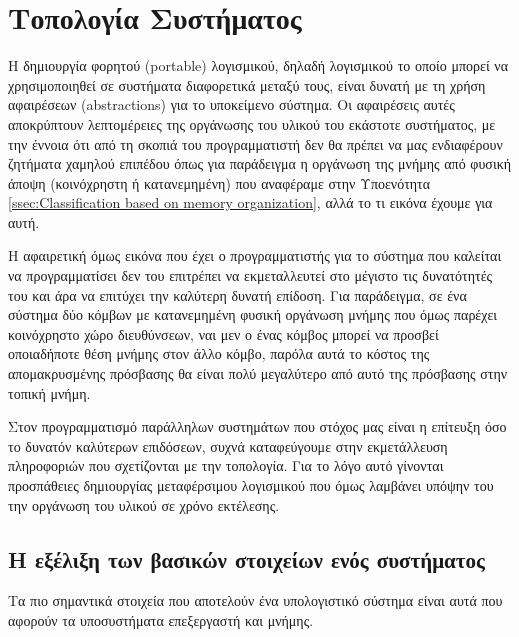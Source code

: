 \chapter{Τοπολογία Συστήματος}
\label{ch:System Topology}
Η δημιουργία φορητού (portable) λογισμικού, δηλαδή λογισμικού το οποίο μπορεί να χρησιμοποιηθεί σε συστήματα διαφορετικά μεταξύ τους, είναι δυνατή με τη χρήση αφαιρέσεων (abstractions) για το υποκείμενο σύστημα. Οι αφαιρέσεις αυτές αποκρύπτουν λεπτομέρειες της οργάνωσης του υλικού του εκάστοτε συστήματος, με την έννοια ότι από τη σκοπιά του προγραμματιστή δεν θα πρέπει να μας ενδιαφέρουν ζητήματα χαμηλού επιπέδου όπως για παράδειγμα η οργάνωση της μνήμης από φυσική άποψη (κοινόχρηστη ή κατανεμημένη) που αναφέραμε στην Υποενότητα \ref{ssec:Classification based on memory organization}, αλλά το τι εικόνα έχουμε για αυτή.

Η αφαιρετική όμως εικόνα που έχει ο προγραμματιστής για το σύστημα που καλείται να προγραμματίσει δεν του επιτρέπει να εκμεταλλευτεί στο μέγιστο τις δυνατότητές του και άρα να επιτύχει την καλύτερη δυνατή επίδοση. Για παράδειγμα, σε ένα σύστημα δύο κόμβων με κατανεμημένη φυσική οργάνωση μνήμης που όμως παρέχει κοινόχρηστο χώρο διευθύνσεων, ναι μεν ο ένας κόμβος μπορεί να προσβεί οποιαδήποτε θέση μνήμης στον άλλο κόμβο, παρόλα αυτά το κόστος της απομακρυσμένης πρόσβασης θα είναι πολύ μεγαλύτερο από αυτό της πρόσβασης στην τοπική μνήμη.

Στον προγραμματισμό παράλληλων συστημάτων που στόχος μας είναι η επίτευξη όσο το δυνατόν καλύτερων επιδόσεων, συχνά καταφεύγουμε στην εκμετάλλευση πληροφοριών που σχετίζονται με την τοπολογία. Για το λόγο αυτό γίνονται προσπάθειες δημιουργίας μεταφέρσιμου λογισμικού που όμως λαμβάνει υπόψην του την οργάνωση του υλικού σε χρόνο εκτέλεσης.



\section{Η εξέλιξη των βασικών στοιχείων ενός συστήματος}
Τα πιο σημαντικά στοιχεία που αποτελούν ένα υπολογιστικό σύστημα είναι αυτά που αφορούν τα υποσυστήματα επεξεργαστή και μνήμης.

